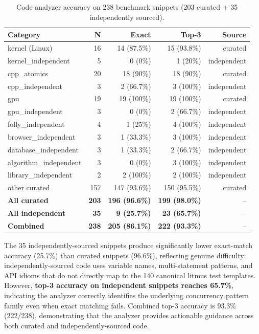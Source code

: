\documentclass[11pt]{article}
\begin{document}
\begin{table}[ht]
\centering
\caption{Code analyzer accuracy on 238 benchmark snippets (203 curated + 35 independently sourced).}
\label{tab:ast-accuracy}
\small
\begin{tabular}{lrrrr}
\toprule
\textbf{Category} & \textbf{N} & \textbf{Exact} & \textbf{Top-3} & \textbf{Source} \\
\midrule
kernel (Linux)          & 16  & 14 (87.5\%) & 15 (93.8\%) & curated \\
kernel\_independent     & 5   & 0 (0\%)     & 1 (20\%)    & independent \\
cpp\_atomics            & 20  & 18 (90\%)   & 18 (90\%)   & curated \\
cpp\_independent        & 3   & 2 (66.7\%)  & 3 (100\%)   & independent \\
gpu                     & 19  & 19 (100\%)  & 19 (100\%)  & curated \\
gpu\_independent        & 3   & 0 (0\%)     & 2 (66.7\%)  & independent \\
folly\_independent      & 4   & 1 (25\%)    & 4 (100\%)   & independent \\
browser\_independent    & 3   & 1 (33.3\%)  & 3 (100\%)   & independent \\
database\_independent   & 3   & 1 (33.3\%)  & 2 (66.7\%)  & independent \\
algorithm\_independent  & 3   & 0 (0\%)     & 3 (100\%)   & independent \\
library\_independent    & 2   & 2 (100\%)   & 2 (100\%)   & independent \\
other curated           & 157 & 147 (93.6\%) & 150 (95.5\%) & curated \\
\midrule
\textbf{All curated}    & \textbf{203} & \textbf{196 (96.6\%)} & \textbf{199 (98.0\%)} & -- \\
\textbf{All independent} & \textbf{35} & \textbf{9 (25.7\%)} & \textbf{23 (65.7\%)} & -- \\
\textbf{Combined}       & \textbf{238} & \textbf{205 (86.1\%)} & \textbf{222 (93.3\%)} & -- \\
\bottomrule
\end{tabular}
\end{table}

\noindent
The 35 independently-sourced snippets produce significantly lower exact-match
accuracy (25.7\%) than curated snippets (96.6\%), reflecting
genuine difficulty: independently-sourced code uses
variable names, multi-statement patterns, and API idioms that do not
directly map to the 140 canonical litmus test templates.
However, \textbf{top-3 accuracy on independent snippets reaches 65.7\%},
indicating the analyzer correctly identifies the underlying concurrency
pattern family even when exact matching fails.
Combined top-3 accuracy is 93.3\% (222/238), demonstrating that the
analyzer provides actionable guidance across both curated and
independently-sourced code.
\end{document}
